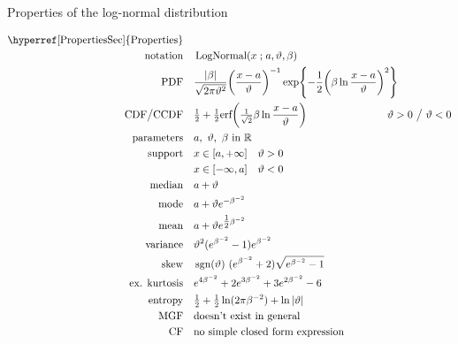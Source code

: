 

\begin{table*}[t!]
\caption[Log-normal distribution -- Properties]{Properties of the log-normal distribution}
 \begin{align*}
\text{\hyperref[PropertiesSec]{Properties}}  \quad& \\
\text{notation} \quad & \op{LogNormal}(x\given a, \vartheta,\beta ) \checked  	
\\
\text{PDF}\quad &   \frac{|\beta|}{\sqrt{2\pi \vartheta^2}} \Left(\frac{x-a}{\vartheta}\Right)^{-1} \exp\Left\{-\frac{1}{2} \Left( \beta \ln \frac{x-a}{\vartheta} \Right)^2 \Right\}	\checked					
\\
\text{CDF} \big/ \text{CCDF} \quad  &   \tfrac{1}{2} +  \tfrac{1}{2}\text{erf}\Left( \sfrac{1}{\sqrt{2}} \beta \ln \frac{x-a}{\vartheta} \Right) \checked
& \hspace{-2em} \vartheta >0 \ \big/ \ \vartheta <0
\\
\text{parameters}\quad &   a,\  \vartheta,\ \beta \text{ in } \Real		 \checked
\\
\text{support} \quad &   x \in [a, +\infty] \quad \vartheta>0 \checked
\\
& x \in [-\infty,a] \quad \vartheta<0 \checked
\\
\text{median} \quad  &  a+ \vartheta \checked
\\
\text{mode} \quad  & a+ \vartheta e^{-\beta^{-2}} \checked
\\
\text{mean} \quad  &  a + \vartheta e^{\tfrac{1}{2} \beta^{-2}} \checked
\\
\text{variance} \quad  & \vartheta^2 (e^{\beta^{-2}} -1) e^{\beta^{-2}} \checked
\\
\text{skew} \quad  & \op{sgn}(\vartheta)\  ( e^{\beta^{-2}} +2) \sqrt{e^{\beta^{-2}} -1} \checked
\\
\text{ex. kurtosis} \quad  &  e^{4\beta^{-2}} +2e^{3\beta^{-2}} +3e^{2\beta^{-2}} -6 \checked
\\
\text{entropy} \quad  & \tfrac{1}{2} + \tfrac{1}{2} \ln(2\pi\beta^{-2}) + \ln | \vartheta | \checked
\\
\text{MGF} \quad  &  \text{doesn't exist in general} \checked
\\
\text{CF} \quad  &  \text{no simple closed form expression} \checked
\end{align*}
\end{table*}
